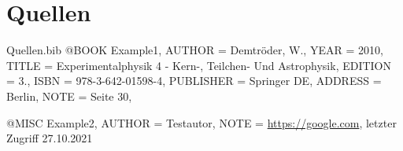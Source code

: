 \section{Quellen}
\renewcommand{\refname}{}   %



\begin{filecontents}{Quellen.bib}
@BOOK
{
    Example1,
	AUTHOR = {Demtröder, W.},
	YEAR = {2010},
	TITLE = {Experimentalphysik 4 - Kern-, Teilchen- Und Astrophysik},
	EDITION = {3.},
	ISBN = {978-3-642-01598-4},
	PUBLISHER = {Springer DE},
	ADDRESS = {Berlin},
    NOTE = {Seite 30},
}

@MISC
{
    Example2,
	AUTHOR = {Testautor},
    NOTE = {\url{https://google.com}, letzter Zugriff 27.10.2021}
}
\end{filecontents}